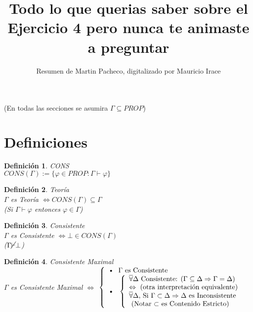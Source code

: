 \documentclass[12pt,a4paper]{article}
\title{Todo lo que querias saber sobre el Ejercicio 4 pero nunca te animaste a preguntar}
\author{Resumen de Martin Pacheco, digitalizado por Mauricio Irace}
\newtheorem*{definition}{Definición}
\begin{document}
\maketitle
(En todas las secciones se asumira $\Gamma \subseteq PROP$)

\section*{Definiciones}

\begin{definition} \emph{CONS}\\
	$CONS( \Gamma ) := \{ \varphi \in PROP : \Gamma \vdash  \varphi \}$
\end{definition}
\begin{definition}

\emph{Teoría}\\
	$\Gamma$ es Teoría $ \Leftrightarrow CONS(\Gamma)\subseteq \Gamma$ \\ 
	 (Si $ \Gamma \vdash \varphi$ entonces $\varphi \in \Gamma$)
\end{definition}

\begin{definition}
	\emph{Consistente}\\
	$\Gamma$ es Consistente $ \Leftrightarrow \bot \in CONS(\Gamma)$ \\
	($ \Gamma \cancel{\vdash} \bot$)
\end{definition}

\begin{definition}
	\emph{Consistente Maximal}\\
	$\Gamma$ es Consistente Maximal $\Leftrightarrow$
	$\left\{\begin{array}{l}
		 \text{\textbullet}\ \ \Gamma \textnormal{ es Consistente} \\ 
     \text{\textbullet}\ \ \left\{ \begin{array}{l}
      \overline{\forall} \Delta \textnormal{ Consistente: } ( \Gamma \subseteq \Delta \Rightarrow \Gamma = \Delta ) \\
     \Leftrightarrow \textnormal{ (otra interpretación equivalente)}\\
		 \overline{\forall} \Delta \textnormal{, Si } \Gamma \subset \Delta \Rightarrow \Delta \textnormal{ es Inconsistente} \\
		 \textnormal{ (Notar $\subset$ es Contenido Estricto) }
     \end{array} 
		 \right.
	 \end{array}
	 \right.$

\end{definition}
\end{document}
